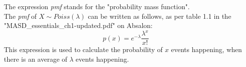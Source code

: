 The expression \textit{pmf} stands for the "probability mass function".\\
The \textit{pmf} of $X \sim \textit{Poiss}(\lambda)$ can be written as follows, as per table 1.1 in the "MASD\_essentials\_ch1-updated.pdf" on Absalon:
$$
p(x)=e^{-\lambda}\frac{\lambda^x}{x!}
$$
This expression is used to calculate the probability of $x$ events happening, when there is an average of $\lambda$ events happening.